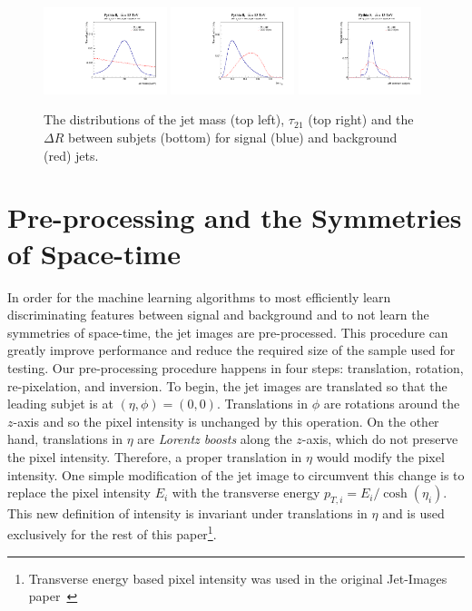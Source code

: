 \begin{figure}[htbp!]
  \begin{center}
        \includegraphics[width=0.32\textwidth]{figures/mass.pdf} 
        \includegraphics[width=0.32\textwidth]{figures/tau21.pdf} 
        \includegraphics[width=0.32\textwidth]{figures/dR.pdf}
      \caption{ The distributions of the jet mass (top left), $\tau_{21}$ (top right) and the $\Delta R$ between subjets (bottom) for signal (blue) and background (red) jets.
      \label{fig:datastats} }
    \end{center}
\end{figure}


\section{Pre-processing and the Symmetries of Space-time}
\label{sec:preprocess}

In order for the machine learning algorithms to most efficiently learn discriminating features between signal and background and to not learn the symmetries of space-time, the jet images are pre-processed.  This procedure can greatly improve performance and reduce the required size of the sample used for testing.  Our pre-processing procedure happens in four steps: translation, rotation, re-pixelation, and inversion.  To begin, the jet images are translated so that the leading subjet is at $(\eta,\phi)=(0,0)$.  Translations in $\phi$ are rotations around the $z$-axis and so the pixel intensity is unchanged by this operation.  On the other hand, translations in $\eta$ are {\it Lorentz boosts} along the $z$-axis, which do not preserve the pixel intensity.  Therefore, a proper translation in $\eta$ would modify the pixel intensity.  One simple modification of the jet image to circumvent this change is to replace the pixel intensity $E_i$ with the transverse energy $p_{T,i}=E_i/\cosh(\eta_i)$.  This new definition of intensity is invariant under translations in $\eta$ and is used exclusively for the rest of this paper\footnote{Transverse energy based pixel intensity was used in the original Jet-Images paper~\cite{Cogan:2014oua}}.

